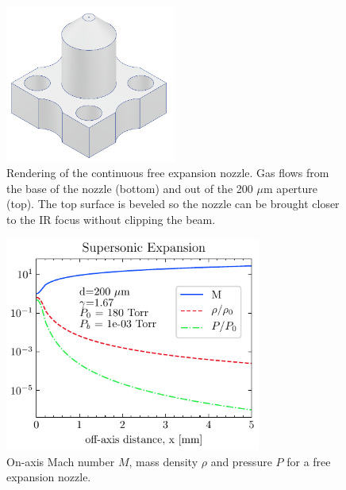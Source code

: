 \begin{figure}
	\centering
	\includegraphics[width=0.5\textwidth]{figures/chap3/gas_nozzle.png}
	\caption{Rendering of the continuous free expansion nozzle. Gas flows from the base of the nozzle (bottom) and out of the 200 $\mu$m aperture (top). The top surface is beveled so the nozzle can be brought closer to the IR focus without clipping the beam.}
	\label{fig:gas_nozzle}
\end{figure}

\begin{figure}
	\centering
	\includegraphics[width=0.75\textwidth]{figures/chap3/M_rho_P_vs_x.pdf}
	\caption{On-axis Mach number $M$, mass density $\rho$ and pressure $P$ for a free expansion nozzle.}
	\label{fig:M_rho_vs_x}
\end{figure}

